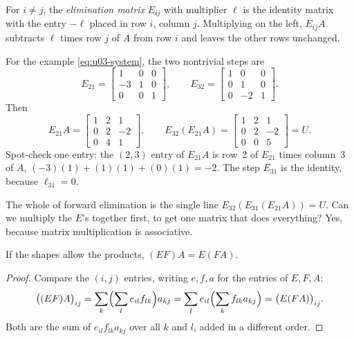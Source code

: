 \begin{definition}\label{def:u03-Eij}
For $i\neq j$, the \emph{elimination matrix} $E_{ij}$ with multiplier $\ell$ is the identity
matrix with the entry $-\ell$ placed in row $i$, column $j$. Multiplying on the left,
$E_{ij}A$ subtracts $\ell$ times row $j$ of $A$ from row $i$ and leaves the other rows
unchanged.
\end{definition}

\begin{example}\label{ex:u03-matrices}
For the example \eqref{eq:u03-system}, the two nontrivial steps are
\[
  E_{21}=\begin{bmatrix} 1 & 0 & 0\\ -3 & 1 & 0\\ 0 & 0 & 1\end{bmatrix},\qquad
  E_{32}=\begin{bmatrix} 1 & 0 & 0\\ 0 & 1 & 0\\ 0 & -2 & 1\end{bmatrix}.
\]
Then
\[
  E_{21}A=\begin{bmatrix} 1 & 2 & 1\\ 0 & 2 & -2\\ 0 & 4 & 1\end{bmatrix},\qquad
  E_{32}(E_{21}A)=\begin{bmatrix} 1 & 2 & 1\\ 0 & 2 & -2\\ 0 & 0 & 5\end{bmatrix}=U.
\]
Spot-check one entry: the $(2,3)$ entry of $E_{21}A$ is row~2 of $E_{21}$ times column~3 of
$A$, $(-3)(1)+(1)(1)+(0)(1)=-2$. The step $E_{31}$ is the identity, because $\ell_{31}=0$.
\end{example}

The whole of forward elimination is the single line $E_{32}(E_{31}(E_{21}A))=U$. Can we
multiply the $E$'s together first, to get one matrix that does everything? Yes, because
matrix multiplication is associative.

\begin{proposition}\label{prop:u03-assoc}
If the shapes allow the products, $(EF)A=E(FA)$.
\end{proposition}

\begin{proof}
Compare the $(i,j)$ entries, writing $e,f,a$ for the entries of $E,F,A$:
\[
  \bigl((EF)A\bigr)_{ij}=\sum_k\Bigl(\sum_l e_{il}f_{lk}\Bigr)a_{kj}
  =\sum_l e_{il}\Bigl(\sum_k f_{lk}a_{kj}\Bigr)=\bigl(E(FA)\bigr)_{ij}.
\]
Both are the sum of $e_{il}f_{lk}a_{kj}$ over all $k$ and $l$, added in a different order.
\end{proof}


